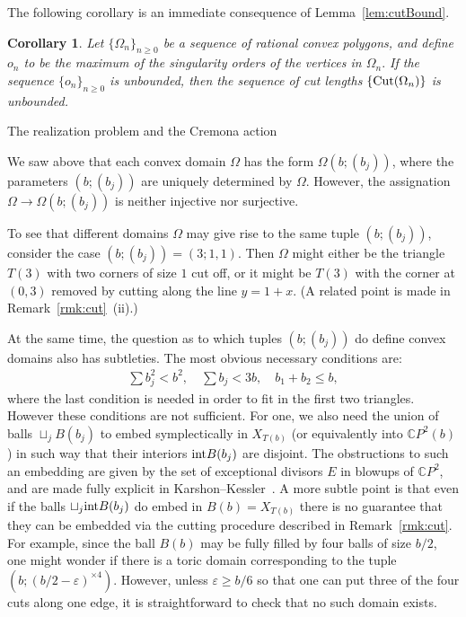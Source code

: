 \documentclass[11pt, reqno]{amsart}
\makeatletter
\def\subsection{\@startsection{subsection}{2}%
  \z@{.75\linespacing\@plus.7\linespacing}{-.5em}%
  {\normalfont\large\bfseries}}
\newtheorem{cor}[thm]{Corollary}
\theoremstyle{remark}
\numberwithin{equation}{subsection}
\numberwithin{figure}{section}
\theoremstyle{customremark}
\newcommand{\intt}{{\rm int}}
\newcommand{\Om}{{\Omega}}
\newcommand{\C}{\mathbb{C}}
\newcommand{\eps}{\varepsilon}
\makeatother
\begin{document}
The following corollary is an immediate consequence of Lemma~\ref{lem:cutBound}.
\begin{cor} \label{cor:cutLength}
    Let $\{\Omega_n\}_{n\geq 0}$ be a sequence of rational convex polygons, and define $o_n$ to be the maximum of
    the  singularity orders of the vertices in $\Omega_n.$ If the sequence $\{o_n\}_{n \geq 0}$ is unbounded, then the sequence of cut lengths $\{{\rm Cut}(\Om_n)\}$ is unbounded.  
\end{cor}



\subsection{The realization problem and the Cremona action}\label{ss:Crem}

We saw above that each convex domain $\Om$ has the form $\Om(b; (b_j))$, where the
 parameters $(b; (b_j))$ are uniquely determined by $\Om$.  However, the assignation $\Om \to \Om(b; (b_j))$ is neither injective nor surjective. 
 
 To see that
 different domains $\Om$ may give rise to the same  tuple $(b; (b_j))$, consider the case  $(b; (b_j)) = (3;1,1)$.
Then $\Om$ might either be the triangle $T(3)$ with two corners of size $1$ cut off, or it might be $T(3)$ with the corner at $(0,3)$ removed by cutting along the line $y = 1+x$.  (A related  point is made in Remark~\ref{rmk:cut}~(ii).)

At the same time, the question as to which tuples $(b; (b_j))$ do define convex domains also has subtleties.  
The most obvious necessary conditions are:
\begin{align}\label{eq:cutcondit}
\sum b_j^2 < b^2, \quad \sum b_j < 3b, \quad b_1+b_2\le b,
\end{align}
where the last condition is needed in order to fit in the first two triangles. 
However these conditions are not sufficient.  For one, we also need the union of balls $\sqcup_j B(b_j)$ to embed symplectically in $X_{T(b)}$ (or equivalently into $\C P^2(b)$) in such way that their interiors $\intt B(b_j)$ are disjoint. The obstructions to such an embedding are  given by the set of exceptional divisors $E$ in blowups of $\C P^2$, and are made fully explicit in  Karshon--Kessler~\cite{KK}.
A more subtle point is that  even if the balls $\sqcup_j \intt B(b_j)$ do embed in  $B(b) = X_{T(b)}$ there is no guarantee that they can be embedded via the cutting procedure described  in Remark~\ref{rmk:cut}.  For example, since the ball $B(b)$ may be fully filled by four balls of size $b/2$, one might wonder if there is a toric domain corresponding to the tuple $(b; (b/2 - \eps)^{\times 4})$. However, unless $\eps\ge b/6$ so that one can put three of the four cuts along one edge,  it is straightforward to check that no such domain exists.
\end{document}
